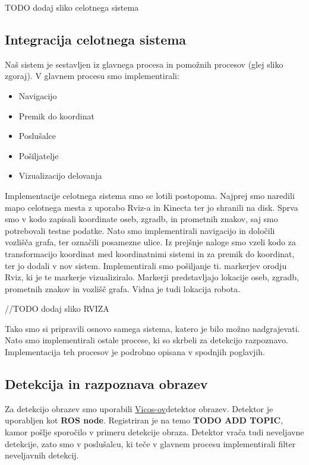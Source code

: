 \documentclass[a4paper,11pt]{article}
\begin{document}
TODO dodaj sliko celotnega sistema

\subsection{Integracija celotnega sistema}

Naš sistem je sestavljen iz glavnega procesa in pomožnih procesov (glej sliko zgoraj). V glavnem procesu smo implementirali:
\begin{itemize}
\item Navigacijo
\item Premik do koordinat
\item Poslušalce
\item Pošiljatelje
\item Vizualizacijo delovanja
\end{itemize}

Implementacije celotnega sistema smo se lotili postopoma. Najprej smo naredili mapo celotnega mesta z uporabo Rviz-a in Kinecta ter jo shranili na disk. Sprva smo v kodo zapisali koordinate oseb, zgradb, in prometnih znakov, saj smo potrebovali testne podatke. Nato smo implementirali navigacijo in določili vozlišča grafa, ter označili posamezne ulice. Iz prejšnje naloge smo vzeli kodo za transformacijo koordinat med koordinatnimi sistemi in za premik do koordinat, ter jo dodali v nov sistem. Implementirali smo pošiljanje ti. markerjev orodju Rviz, ki je te markerje vizualiziralo. Markerji predstavljajo lokacije oseb, zgradb, prometnih znakov in vozlišč grafa. Vidna je tudi lokacija robota.

//TODO dodaj sliko RVIZA

Tako smo si pripravili osnovo samega sistema, katero je bilo možno nadgrajevati. Nato smo implementirali ostale procese, ki so skrbeli za detekcijo razpoznavo. Implementacija teh procesov je podrobno opisana v spodnjih poglavjih.

\subsection{Detekcija in razpoznava obrazev}

Za detekcijo obrazev smo uporabili \href{https://github.com/vicoslab/vicos_ros}{Vicos-ov}detektor obrazev. Detektor je uporabljen kot \textbf{ROS node}. Registriran je na temo \textbf{TODO ADD TOPIC}, kamor pošlje sporočilo v primeru detekcije obraza. Detektor vrača tudi neveljavne detekcije, zato smo v poslušalcu, ki teče v glavnem procesu implementirali filter neveljavnih detekcij.
\end{document}

